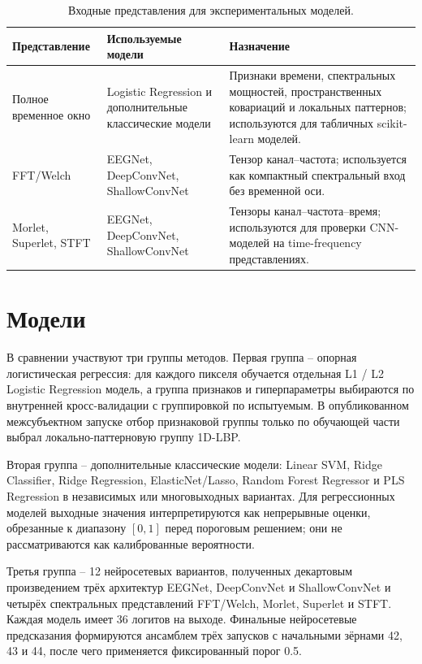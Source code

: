 \begin{table}[!t]
  \centering
  \small
  \setlength{\tabcolsep}{3pt}
  \renewcommand{\arraystretch}{1.15}
  \caption{Входные представления для экспериментальных моделей.}
  \label{tab:experiment-input-representations}
  \begin{tabularx}{\textwidth}{|L{36mm}|L{39mm}|Y|}
    \hline
    Представление & Используемые модели & Назначение \\
    \hline
    Полное временное окно &
    Logistic Regression и дополнительные классические модели &
    Признаки времени, спектральных мощностей, пространственных ковариаций и
    локальных паттернов; используются для табличных scikit-learn моделей. \\
    \hline
    FFT/Welch &
    EEGNet, DeepConvNet, ShallowConvNet &
    Тензор канал--частота; используется как компактный спектральный вход без
    временной оси. \\
    \hline
    Morlet, Superlet, STFT &
    EEGNet, DeepConvNet, ShallowConvNet &
    Тензоры канал--частота--время; используются для проверки CNN-моделей на
    time-frequency представлениях. \\
    \hline
  \end{tabularx}
\end{table}

\section{Модели}

В сравнении участвуют три группы методов. Первая группа -- опорная
логистическая регрессия: для каждого пикселя обучается отдельная L1 / L2
Logistic Regression модель, а группа признаков и гиперпараметры выбираются
по внутренней кросс-валидации с группировкой по испытуемым. В опубликованном
межсубъектном запуске отбор признаковой группы только по обучающей части
выбрал локально-паттерновую группу 1D-LBP.

Вторая группа -- дополнительные классические модели: Linear SVM, Ridge Classifier,
Ridge Regression, ElasticNet/Lasso, Random Forest Regressor и PLS Regression
в независимых или многовыходных вариантах. Для регрессионных моделей выходные
значения интерпретируются как непрерывные оценки, обрезанные к диапазону
$[0,1]$ перед пороговым решением; они не рассматриваются как
калиброванные вероятности.

Третья группа -- 12 нейросетевых вариантов, полученных декартовым
произведением трёх архитектур EEGNet, DeepConvNet и ShallowConvNet и четырёх
спектральных представлений FFT/Welch, Morlet, Superlet и STFT. Каждая модель
имеет 36 логитов на выходе. Финальные нейросетевые предсказания формируются
ансамблем трёх запусков с начальными зёрнами 42, 43 и 44, после чего
применяется фиксированный порог 0.5.

